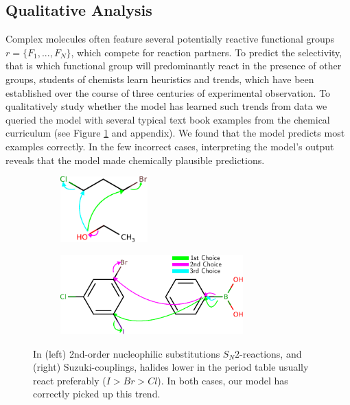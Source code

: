 
\subsection{Qualitative Analysis}

Complex molecules often feature several potentially reactive functional groups $r=\{F_1,...,F_N\}$, which compete for reaction partners. 
To predict the selectivity, that is which functional group will predominantly react in the presence of other groups, 
students of chemists learn heuristics and trends, 
which have been established over the course of three centuries of experimental observation.
To qualitatively study whether the model has learned such trends from data we queried the model with several typical text book examples from the chemical curriculum (see Figure \ref{fig:qualitative} and appendix). 
We found that the model predicts most examples correctly. In the few incorrect cases, interpreting the model's output reveals that the model made chemically plausible predictions.


\begin{figure}[t]

    \centering
    \begin{subfigure}[b]{0.4\textwidth}
        \centering
        \includegraphics[height=1.0in]{imgs/textbook/reaction3}\\\vspace{0.1in}
    \end{subfigure}%
     \begin{subfigure}[b]{0.6\textwidth}
        \centering
        \includegraphics[height=1.2in]{imgs/textbook/reaction7}
    \end{subfigure}
	\caption{In (left) 2nd-order nucleophilic substitutions $S_N 2$-reactions, and (right) Suzuki-couplings, halides lower in the period table usually react preferably ($I>Br>Cl$). In both cases, our model has correctly picked up this trend.}
	\label{fig:qualitative}
\end{figure}


